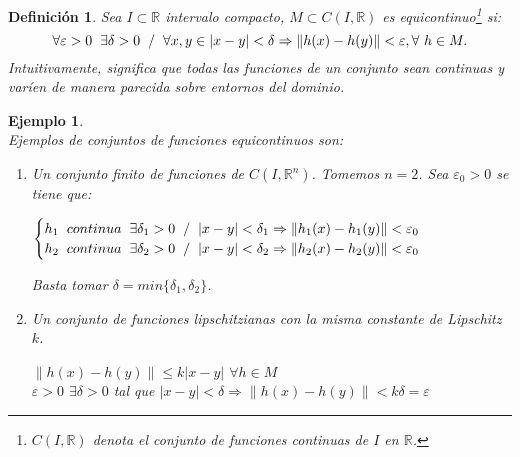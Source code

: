 \documentclass{article}
\newcommand{\iindex}[1]{\emph{#1}\index{#1}}
\providecommand{\norm}[1]{\lVert#1\rVert}
\theoremstyle{theorem-style}  %
\theoremstyle{definition-style}
\newtheorem{definition}{Definición}[section]
\theoremstyle{example-style}
\newtheorem{example}{Ejemplo}[section]
\begin{document}
\begin{definition}
	Sea $I \subset \mathbb{R}$ intervalo compacto, $M \subset C(I, \mathbb{R})$ es \iindex{equicontinuo}\footnote{ $ C(I, \mathbb{R})$ denota el conjunto de funciones continuas de $ I $ en $ \mathbb{R} $.} si:
	\[\forall \varepsilon > 0 \hspace{0,2cm} \exists \delta > 0 \hspace{0,2cm} / \hspace{0,2cm} \forall x, y\in |x-y| < \delta \Rightarrow \norm{h(x) - h(y)} < \varepsilon, \forall \ h \in M.\]
	Intuitivamente, significa que todas las funciones de un conjunto sean continuas y varíen de manera parecida sobre entornos del dominio.
\end{definition}
\begin{example} \ \\
	Ejemplos de conjuntos de funciones equicontinuos son:
	\begin{enumerate}
		\item Un conjunto finito de funciones de $C(I, \mathbb{R}^n)$. Tomemos $n = 2$. Sea $\varepsilon_0 > 0$ se tiene que:
		\begin{center}
			$\begin{cases}
			h_1 \hspace{0,2cm} continua \hspace{0,2cm} \exists \delta_1 > 0 \hspace{0,2cm} / \hspace{0,2cm} |x-y|<\delta_1 \Rightarrow \norm{h_1(x) - h_1(y)} < \varepsilon_0 \\
			h_2 \hspace{0,2cm} continua \hspace{0,2cm} \exists \delta_2 > 0 \hspace{0,2cm} / \hspace{0,2cm} |x-y|<\delta_2 \Rightarrow \norm{h_2(x) - h_2(y)} < \varepsilon_0
			\end{cases}$
		\end{center}
		Basta tomar $\delta = min\{\delta_1, \delta_2\}$.
		\item Un conjunto de funciones lipschitzianas con la misma constante de Lipschitz $k$.
		\begin{center}
			$\norm{h(x) - h(y)}\leq k|x-y|$ $\forall h \in M$ \\
			$\varepsilon > 0$ $\exists \delta > 0$ tal que $|x-y|<\delta \Rightarrow \norm{h(x) - h(y)} < k\delta = \varepsilon$
		\end{center}
	\end{enumerate}
\end{example}
\end{document}
